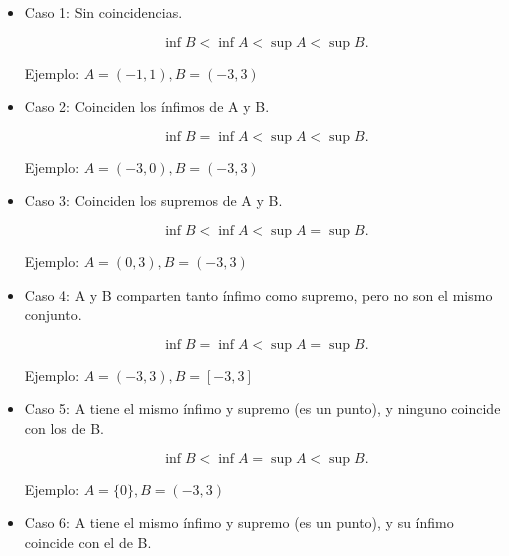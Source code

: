 \documentclass{article}
\begin{document}
\begin{itemize}

\item Caso 1: Sin coincidencias.

\begin{equation}
\mathop{\text{inf}} B < \mathop{\text{inf}} A < \mathop{\text{sup}} A < \mathop{\text{sup}} B.
\end{equation}

Ejemplo: $ A = (-1,1), B = (-3, 3) $

\item Caso 2: Coinciden los ínfimos de A y B.

\begin{equation}
\mathop{\text{inf}} B = \mathop{\text{inf}} A < \mathop{\text{sup}} A < \mathop{\text{sup}} B.
\end{equation}

Ejemplo: $ A = (-3,0), B = (-3,3) $

\item Caso 3: Coinciden los supremos de A y B.

\begin{equation}
\mathop{\text{inf}} B < \mathop{\text{inf}} A < \mathop{\text{sup}} A = \mathop{\text{sup}} B.
\end{equation}

Ejemplo: $ A = (0,3), B = (-3,3) $

\item Caso 4: A y B comparten tanto ínfimo como supremo, pero no son el mismo conjunto.

\begin{equation}
\mathop{\text{inf}} B = \mathop{\text{inf}} A < \mathop{\text{sup}} A = \mathop{\text{sup}} B.
\end{equation}

Ejemplo: $ A = (-3,3), B = [-3,3] $

\item Caso 5: A tiene el mismo ínfimo y supremo (es un punto), y ninguno coincide con los de B.

\begin{equation}
\mathop{\text{inf}} B < \mathop{\text{inf}} A = \mathop{\text{sup}} A < \mathop{\text{sup}} B.
\end{equation}

Ejemplo: $ A = \{0\}, B = (-3,3) $

\item Caso 6: A tiene el mismo ínfimo y supremo (es un punto), y su ínfimo coincide con el de B.


\end{itemize}
\end{document}
